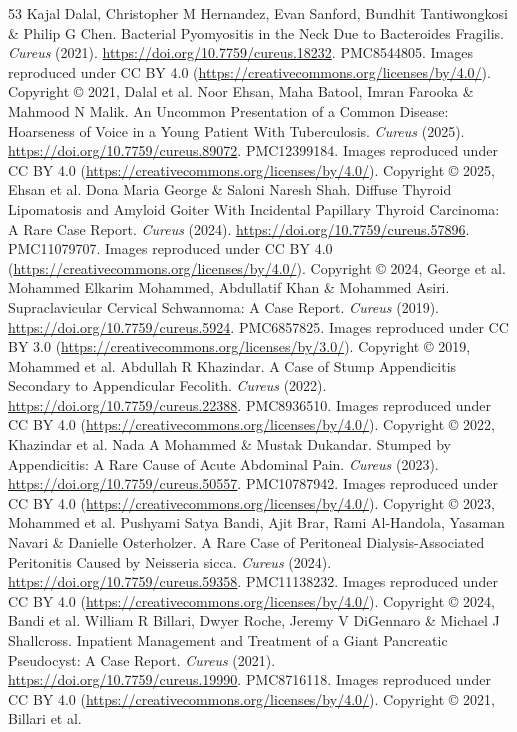 \begin{thebibliography}{53}
 Kajal Dalal, Christopher M Hernandez, Evan Sanford, Bundhit Tantiwongkosi \& Philip G Chen. Bacterial Pyomyositis in the Neck Due to Bacteroides Fragilis. \textit{Cureus} (2021). \url{https://doi.org/10.7759/cureus.18232}. PMC8544805. Images reproduced under CC BY 4.0 (\url{https://creativecommons.org/licenses/by/4.0/}). Copyright © 2021, Dalal et al.
 Noor Ehsan, Maha Batool, Imran Farooka \& Mahmood N Malik. An Uncommon Presentation of a Common Disease: Hoarseness of Voice in a Young Patient With Tuberculosis. \textit{Cureus} (2025). \url{https://doi.org/10.7759/cureus.89072}. PMC12399184. Images reproduced under CC BY 4.0 (\url{https://creativecommons.org/licenses/by/4.0/}). Copyright © 2025, Ehsan et al.
 Dona Maria George \& Saloni Naresh Shah. Diffuse Thyroid Lipomatosis and Amyloid Goiter With Incidental Papillary Thyroid Carcinoma: A Rare Case Report. \textit{Cureus} (2024). \url{https://doi.org/10.7759/cureus.57896}. PMC11079707. Images reproduced under CC BY 4.0 (\url{https://creativecommons.org/licenses/by/4.0/}). Copyright © 2024, George et al.
 Mohammed Elkarim Mohammed, Abdullatif Khan \& Mohammed Asiri. Supraclavicular Cervical Schwannoma: A Case Report. \textit{Cureus} (2019). \url{https://doi.org/10.7759/cureus.5924}. PMC6857825. Images reproduced under CC BY 3.0 (\url{https://creativecommons.org/licenses/by/3.0/}). Copyright © 2019, Mohammed et al.
 Abdullah R Khazindar. A Case of Stump Appendicitis Secondary to Appendicular Fecolith. \textit{Cureus} (2022). \url{https://doi.org/10.7759/cureus.22388}. PMC8936510. Images reproduced under CC BY 4.0 (\url{https://creativecommons.org/licenses/by/4.0/}). Copyright © 2022, Khazindar et al.
 Nada A Mohammed \& Mustak Dukandar. Stumped by Appendicitis: A Rare Cause of Acute Abdominal Pain. \textit{Cureus} (2023). \url{https://doi.org/10.7759/cureus.50557}. PMC10787942. Images reproduced under CC BY 4.0 (\url{https://creativecommons.org/licenses/by/4.0/}). Copyright © 2023, Mohammed et al.
 Pushyami Satya Bandi, Ajit Brar, Rami Al-Handola, Yasaman Navari \& Danielle Osterholzer. A Rare Case of Peritoneal Dialysis-Associated Peritonitis Caused by Neisseria sicca. \textit{Cureus} (2024). \url{https://doi.org/10.7759/cureus.59358}. PMC11138232. Images reproduced under CC BY 4.0 (\url{https://creativecommons.org/licenses/by/4.0/}). Copyright © 2024, Bandi et al.
 William R Billari, Dwyer Roche, Jeremy V DiGennaro \& Michael J Shallcross. Inpatient Management and Treatment of a Giant Pancreatic Pseudocyst: A Case Report. \textit{Cureus} (2021). \url{https://doi.org/10.7759/cureus.19990}. PMC8716118. Images reproduced under CC BY 4.0 (\url{https://creativecommons.org/licenses/by/4.0/}). Copyright © 2021, Billari et al.

\end{thebibliography}

